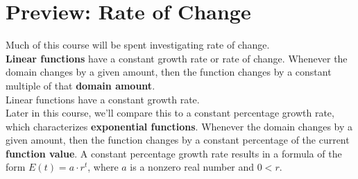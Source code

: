 \documentclass{ximera}
\begin{document}
\section{Preview: Rate of Change}
Much of this course will be spent investigating rate of change. \\

\textbf{Linear functions} have a constant growth rate or rate of change.  Whenever the domain changes by a given amount, then the function changes by a constant multiple of that \textbf{\textcolor{purple!85!blue}{domain amount}}. \\

Linear functions have a constant growth rate.    \\

Later in this course, we'll compare this to a constant percentage growth rate, which characterizes \textbf{exponential functions}. Whenever the domain changes by a given amount, then the function changes by a constant percentage of the current \textbf{\textcolor{blue!55!black}{function value}}.  A constant percentage growth rate results in a formula of the form $E(t) = a \cdot r^t$, where $a$ is a nonzero real number and $0 < r$. \\
\end{document}
